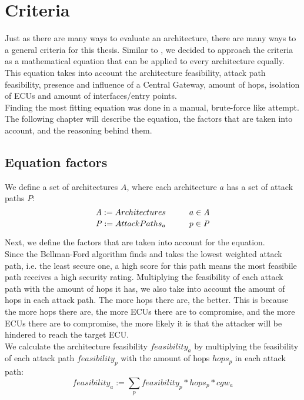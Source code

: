 \chapter{Criteria}
\label{chp:criteria}

Just as there are many ways to evaluate an architecture, there are many ways to a general criteria for this thesis.
Similar to \cite{threat_surf}, we decided to approach the criteria as a mathematical equation that can be applied to every architecture equally.
This equation takes into account the architecture feasibility, attack path feasibility, presence and influence of a Central Gateway,
amount of hops, isolation of ECUs and amount of interfaces/entry points.\\

Finding the most fitting equation was done in a manual, brute-force like attempt.
The following chapter will describe the equation, the factors that are taken into account, and the reasoning behind them.\\

\section{Equation factors}
\label{sec:equation_factors}

We define a set of architectures $\mathit{A}$, where each architecture $a$ has a set of attack paths $\mathit{P}$:\\
\begin{equation}
    \mathit{A} := {Architectures} \hspace*{1cm} a \in \mathit{A} \label{eq:architectures}
\end{equation}
\begin{equation}
    \mathit{P} := {Attack Paths_{a}} \hspace*{1cm} p \in \mathit{P} \label{eq:attack_paths}
\end{equation}

\hfill \break

Next, we define the factors that are taken into account for the equation.\\

Since the Bellman-Ford algorithm finds and takes the lowest weighted attack path, i.e. the least secure one, 
a high score for this path means the most feasibile path receives a high security rating.
Multiplying the feasibility of each attack path with the amount of hops it has, we also take into account the amount of hops in each attack path.
The more hops there are, the better.
This is because the more hops there are, the more ECUs there are to compromise, 
and the more ECUs there are to compromise, the more likely it is that the attacker will be hindered to reach the target ECU.\\
We calculate the architecture feasibility $feasibility_{a}$ by multiplying the feasibility of each attack path $feasibility_{p}$ with the amount of hops $hops_{p}$ in each attack path:
\begin{equation}
    feasibility_{a} := \sum_{p} feasibility_{p} * hops_{p} * cgw_{a} \label{eq:feasibility}
\end{equation}

